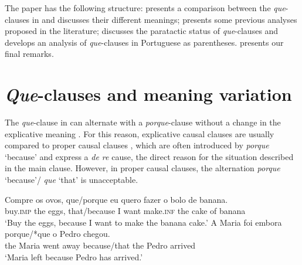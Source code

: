 \documentclass[output=paper,colorlinks,citecolor=brown,
]{langscibook}
\begin{document}
The paper has the following structure:  presents a comparison between the \textit{que}-clauses in  and discusses their different meanings;  presents some previous analyses proposed in the literature;  discusses the paratactic status of \textit{que}-clauses and  develops an analysis of \textit{que}-clauses in Portuguese as parentheses.  presents our final remarks.

\section{\textit{Que}-clauses and meaning variation} \label{sec:matos:sect2}

The \textit{que}-clause in  can alternate with a \textit{porque}-clause without a change in the explicative meaning . For this reason, explicative causal clauses are usually compared to proper causal clauses , which are often introduced by \textit{porque} ‘because’ and express a \textit{de re} cause, the direct reason for the situation described in the main clause. However, in proper causal clauses, the alternation \textit{porque} ‘because’/ \textit{que} ‘that’ is unacceptable.

\ea \label{ex:matos:ovos2}
 \ea \label{ex:matos:ovos2-porque}
 \gll Compre os ovos, que/porque eu quero fazer o bolo de banana.\\
      buy.\textsc{imp} the eggs, that/because I want make.\textsc{inf} the cake of banana\\
 \glt ‘Buy the eggs, because I want to make the banana cake.’
 \ex \label{ex:matos:maria-pedro}
 \gll A Maria foi embora porque/*que o Pedro chegou.\\
	  the Maria went away because/that the Pedro arrived\\
 \glt ‘Maria left because Pedro has arrived.’
\z
\z
\end{document}
